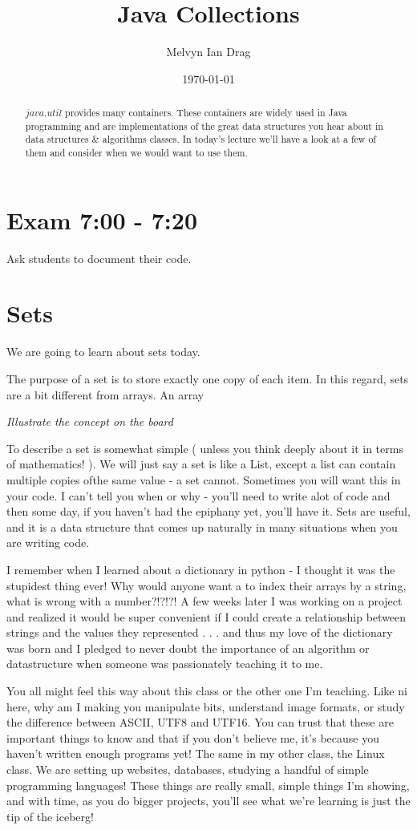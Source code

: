 \documentclass[12pt]{article}
\title{Java Collections}
\author{
	Melvyn Ian Drag
}
\date{\today}
\begin{document}
\maketitle

\begin{abstract}
$java.util$ provides many containers. These containers are widely used in Java programming and are implementations of the great data structures you hear about in data structures \& algorithms classes. In today's lecture we'll have a look at a few of them and consider when we would want to use them.
\end{abstract}

\section{Exam 7:00 - 7:20}
Ask students to document their code.

\section{Sets}
We are going to learn about sets today.

The purpose of a set is to store exactly one copy of each item. In this regard, sets are a bit different from arrays. An array 

\textit{Illustrate the concept on the board}

To describe a set is somewhat simple ( unless you think deeply about it in terms of mathematics! ). We will just say a set is like a List, except a list can contain multiple copies ofthe same value - a set cannot. Sometimes you will want this in your code. I can't tell you when or why - you'll need to write alot of code and then some day, if you haven't had the epiphany yet, you'll have it. Sets are useful, and it is a data structure that comes up naturally in many situations when you are writing code. 

I remember when I learned about a dictionary in python - I thought it was the stupidest thing ever! Why would anyone want a to index their arrays by a string, what is wrong with a number?!?!?! A few weeks later I was working on a project and realized it would be super convenient if I could create a relationship between strings and the values they represented . . . and thus my love of the dictionary was born and I pledged to never doubt the importance of an algorithm or datastructure when someone was passionately teaching it to me.

You all might feel this way about this class or the other one I'm teaching. Like ni here, why am I making you manipulate bits, understand image formats, or study the difference between ASCII, UTF8 and UTF16. You can trust that these are important things to know and that if you don't believe me, it's because you haven't written enough programs yet! The same in my other class, the Linux class. We are setting up websites, databases, studying a handful of simple programming languages! These things are really small, simple things I'm showing, and with time, as you do bigger projects, you'll see what we're learning is just the tip of the iceberg!
\end{document}
